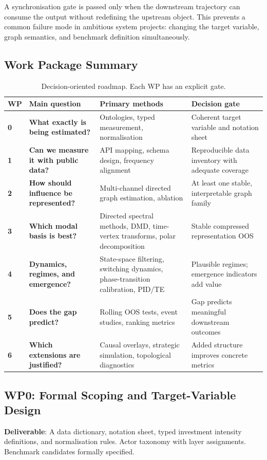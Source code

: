 \documentclass[11pt,a4paper]{article}
\theoremstyle{definition}
\begin{document}
A synchronisation gate is passed only when the downstream trajectory can consume the output without redefining the upstream object. This prevents a common failure mode in ambitious system projects: changing the target variable, graph semantics, and benchmark definition simultaneously.

\subsection{Work Package Summary}

\begin{table}[H]
\centering\small
\begin{tabularx}{\textwidth}{@{}>{\bfseries}p{0.65cm}>{\bfseries}p{2.8cm}Xp{4cm}@{}}
\toprule
WP & Main question & Primary methods & Decision gate \\
\midrule
0 & What exactly is being estimated? & Ontologies, typed measurement, normalisation & Coherent target variable and notation sheet \\
1 & Can we measure it with public data? & API mapping, schema design, frequency alignment & Reproducible data inventory with adequate coverage \\
2 & How should influence be represented? & Multi-channel directed graph estimation, ablation & At least one stable, interpretable graph family \\
3 & Which modal basis is best? & Directed spectral methods, DMD, time-vertex transforms, polar decomposition & Stable compressed representation OOS \\
4 & Dynamics, regimes, and emergence? & State-space filtering, switching dynamics, phase-transition calibration, PID/TE & Plausible regimes; emergence indicators add value \\
5 & Does the gap predict? & Rolling OOS tests, event studies, ranking metrics & Gap predicts meaningful downstream outcomes \\
6 & Which extensions are justified? & Causal overlays, strategic simulation, topological diagnostics & Added structure improves concrete metrics \\
\bottomrule
\end{tabularx}
\caption{Decision-oriented roadmap. Each WP has an explicit gate.}
\label{tab:roadmap}
\end{table}

\subsection{WP0: Formal Scoping and Target-Variable Design}
\textbf{Deliverable}: A data dictionary, notation sheet, typed investment intensity definitions, and normalisation rules. Actor taxonomy with layer assignments. Benchmark candidates formally specified.
\end{document}
